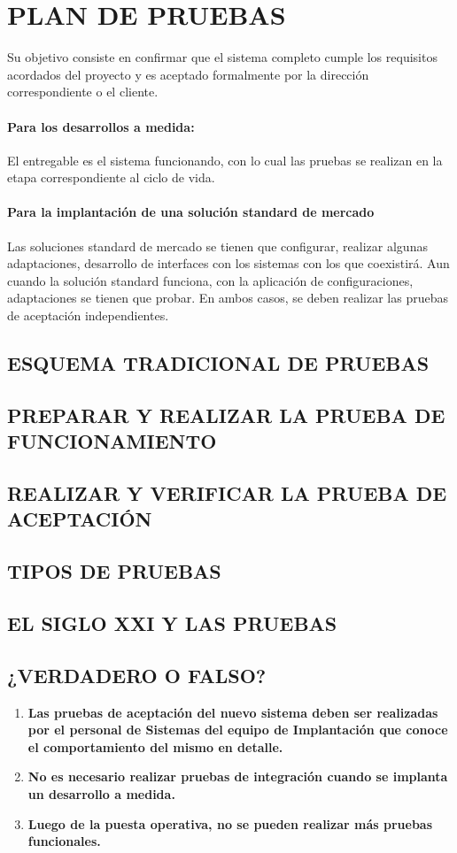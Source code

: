 \documentclass[12pt]{book}
\begin{document}
\chapter{PLAN DE PRUEBAS}
Su objetivo consiste en confirmar que el sistema completo cumple los requisitos acordados del proyecto y es aceptado formalmente por la dirección correspondiente o el cliente.
\subsubsection{Para los desarrollos a medida:}
El entregable es el sistema funcionando, con lo cual las pruebas se realizan en la etapa correspondiente al
ciclo de vida.
\subsubsection{Para la implantación de una solución standard de mercado}
Las soluciones standard de mercado se tienen que configurar, realizar algunas adaptaciones, desarrollo de
interfaces con los sistemas con los que coexistirá.
Aun cuando la solución standard funciona, con la aplicación de configuraciones, adaptaciones se tienen
que probar.
En ambos casos, se deben realizar las pruebas de aceptación independientes.
\section{ESQUEMA TRADICIONAL DE PRUEBAS}
\section{PREPARAR Y REALIZAR LA PRUEBA DE FUNCIONAMIENTO}
\section{REALIZAR Y VERIFICAR LA PRUEBA DE ACEPTACIÓN}
\section{TIPOS DE PRUEBAS}
\section{EL SIGLO XXI Y LAS PRUEBAS}
\section{¿VERDADERO O FALSO?}

\begin{enumerate}
	\item \textbf{Las pruebas de aceptación del nuevo sistema deben ser realizadas por el personal de 						Sistemas del equipo de Implantación que conoce el comportamiento del mismo en detalle.}
	\item \textbf{No es necesario realizar pruebas de integración cuando se implanta un desarrollo a 						medida.}
	\item \textbf{Luego de la puesta operativa, no se pueden realizar más pruebas funcionales.}

\end{enumerate}
\end{document}
